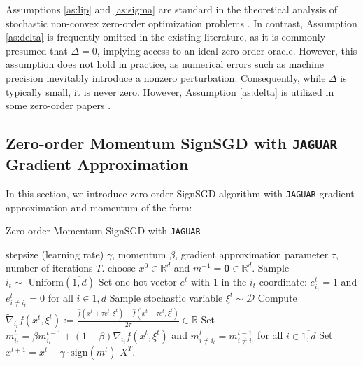 \documentclass{article}
\theoremstyle{plain}
\theoremstyle{definition}
\theoremstyle{remark}
\begin{document}
Assumptions \ref{as:lip} and \ref{as:sigma} are standard in the theoretical analysis of stochastic non-convex zero-order optimization problems \cite{reddy2023convergence, extreme_sparsity, liu2024sparse, wang2024simultaneous}. In contrast, Assumption \ref{as:delta} is frequently omitted in the existing literature, as it is commonly presumed that $\Delta = 0$, implying access to an ideal zero-order oracle. However, this assumption does not hold in practice, as numerical errors such as machine precision inevitably introduce a nonzero perturbation. Consequently, while $\Delta$ is typically small, it is never zero. However, Assumption \ref{as:delta} is utilized in some zero-order papers \cite{dvurechensky2021accelerated, veprikov2024new}.
    

\subsection{Zero-order Momentum SignSGD with \texttt{JAGUAR} Gradient Approximation} \label{subsec:jaguar}

In this section, we introduce zero-order SignSGD algorithm with \texttt{JAGUAR} gradient approximation \cite{veprikov2024new} and momentum of the form:
    
\begin{algorithm}[H]
   \caption{Zero-order Momentum SignSGD with \texttt{JAGUAR} \cite{veprikov2024new}}
   \label{algorithm:jaguar}
\begin{algorithmic}[1]
     stepsize (learning rate) $\gamma$, momentum $\beta$, gradient approximation parameter $\tau$, number of iterations $T$.
     choose  $x^{0} \in \mathbb{R}^d$ and $m^{-1} = \mathbf{0} \in \mathbb{R}^d$.
        \State Sample $i_t \sim \text{ Uniform}(\overline{1, d})$
        \State Set one-hot vector $e^t$ with $1$ in the $i_t$ coordinate: $e^t_{i_t} = 1$ and $e^t_{i \neq i_t} = 0$ for all $i \in \overline{1, d}$
        \State Sample stochastic variable $\xi^t \sim \mathcal{D}$
        \State Compute $\widetilde{\nabla}_{i_t} f(x^{t}, \xi^t) := \frac{\hat{f}(x^t + \tau e^t, \xi^t) - \hat{f}(x^t - \tau e^t, \xi^t)}{2 \tau} \in \mathbb{R}$
        \State Set $m^{t}_{i_t} = \beta m^{t-1}_{i_t} + (1 - \beta) \widetilde{\nabla}_{i_t} f(x^{t}, \xi^t)$ and $m^{t}_{i \neq i_t} = m^{t-1}_{i \neq i_t}$ for all $i \in \overline{1, d}$ \label{line:mt_jaguar_muon}
        \State Set $x^{t+1} = x^t - \gamma \cdot \text{sign}(m^{t})$
    \EndFor
     $X^T$.
\end{algorithmic}
\end{algorithm}
\end{document}
